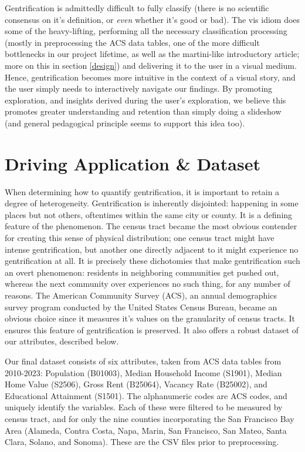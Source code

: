 \documentclass{article}
\begin{document}
    Gentrification is admittedly difficult to fully classify (there is no scientific consensus on it's definition, or \textit{even} whether it's good or bad). The vis idiom does some of the heavy-lifting, performing all the necessary classification processing (mostly in preprocessing the ACS data tables, one of the more difficult bottlenecks in our project lifetime, as well as the martini-like introductory article; more on this in section \ref{design}) and delivering it to the user in a visual medium. Hence, gentrification becomes more intuitive in the context of a visual story, and the user simply needs to interactively navigate our findings. By promoting exploration, and insights derived during the user's exploration, we believe this promotes greater understanding and retention than simply doing a slideshow (and general pedagogical principle seems to support this idea too).

\section{Driving Application \& Dataset}
    
    When determining how to quantify gentrification, it is important to retain a degree of heterogeneity. Gentrification is inherently disjointed: happening in some places but not others, oftentimes within the same city or county. It is a defining feature of the phenomenon. The census tract became the most obvious contender for creating this sense of physical distribution; one census tract might have intense gentrification, but another one directly adjacent to it might experience no gentrification at all. It is precisely these dichotomies that make gentrification such an overt phenomenon: residents in neighboring communities get pushed out, whereas the next community over experiences no such thing, for any number of reasons. The American Community Survey (ACS), an annual demographics survey program conducted by the United States Census Bureau, became an obvious choice since it measures it's values on the granularity of census tracts. It ensures this feature of gentrification is preserved. It also offers a robust dataset of our attributes, described below.

    Our final dataset consists of six attributes, taken from ACS data tables from 2010-2023: Population (B01003), Median Household Income (S1901), Median Home Value (S2506), Gross Rent (B25064), Vacancy Rate (B25002), and Educational Attainment (S1501). The alphanumeric codes are ACS codes, and uniquely identify the variables. Each of these were filtered to be measured by census tract, and for only the nine counties incorporating the San Francisco Bay Area (Alameda, Contra Costa, Napa, Marin, San Francisco, San Mateo, Santa Clara, Solano, and Sonoma). These are the CSV files prior to preprocessing.
\end{document}
